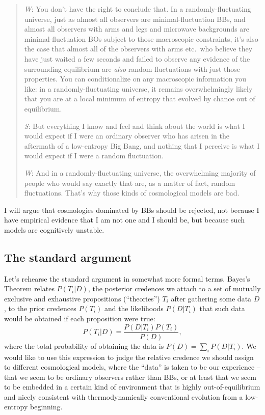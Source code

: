 \documentclass[12pt,letterpaper]{article}
\newcommand{\be}{\begin{equation}}
\newcommand{\ee}{\end{equation}}
\begin{document}
\begin{quotation}
\emph{W}: You don't have the right to conclude that. In a randomly-fluctuating universe, just as almost all observers are minimal-fluctuation BBs, and almost all observers with arms and legs and microwave backgrounds are minimal-fluctuation BOs subject to those macroscopic constraints, it's also the case that almost all of the observers with arms etc.\ who believe they have just waited a few seconds and failed to observe any evidence of the surrounding equilibrium are \emph{also} random fluctuations with just those properties. 
You can conditionalize on any macroscopic information you like: in a randomly-fluctuating universe, it remains overwhelmingly likely that you are at a local minimum of entropy that evolved by chance out of equilibrium.

\emph{S}: But everything I know and feel and think about the world is what I would expect if I were an ordinary observer who has arisen in the aftermath of a low-entropy Big Bang, and nothing that I perceive is what I would expect if I were a random fluctuation.

\emph{W}: And in a randomly-fluctuating universe, the overwhelming majority of people who would say exactly that are, as a matter of fact, random fluctuations. That's why those kinds of cosmological models are bad.
\end{quotation}
I will argue that cosmologies dominated by BBs should be rejected, not because I have empirical evidence that I am not one and I should be, but because such models are cognitively unstable.

\subsection{The standard argument}

Let's rehearse the standard argument in somewhat more formal terms.
Bayes's Theorem relates $P(T_i|D)$, the posterior credences we attach to a set of mutually exclusive and exhaustive propositions (``theories'') $T_i$ after gathering some data $D$, to the prior credences $P(T_i)$ and the likelihoods $P(D|T_i)$ that such data would be obtained if each proposition were true:
\be
  P(T_i|D) = \frac{P(D|T_i)P(T_i)}{P(D)},
  \label{bayes}
\ee
where the total probability of obtaining the data is $P(D) = \sum_i P(D|T_i)$.
We would like to use this expression to judge the relative credence we should assign to different cosmological models, where the ``data'' is taken to be our experience -- that we seem to be ordinary observers rather than BBs, or at least that we seem to be embedded in a certain kind of environment that is highly out-of-equilibrium and nicely consistent with thermodynamically conventional evolution from a low-entropy beginning.
\end{document}
